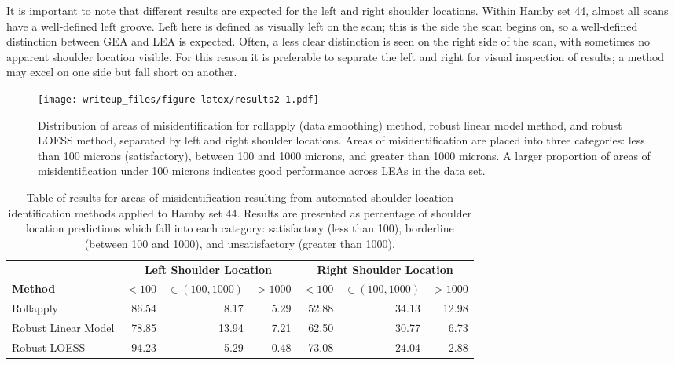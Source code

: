 \documentclass[12pt]{article}
\begin{document}
It is important to note that different results are expected for the left
and right shoulder locations. Within Hamby set 44, almost all scans have
a well-defined left groove. Left here is defined as visually left on the
scan; this is the side the scan begins on, so a well-defined distinction
between GEA and LEA is expected. Often, a less clear distinction is seen
on the right side of the scan, with sometimes no apparent shoulder
location visible. For this reason it is preferable to separate the left
and right for visual inspection of results; a method may excel on one
side but fall short on another.

\begin{figure}
\centering
\texttt{[image: writeup\_files/figure-latex/results2-1.pdf]}
\caption{\label{results2}Distribution of areas of misidentification for
rollapply (data smoothing) method, robust linear model method, and
robust LOESS method, separated by left and right shoulder locations.
Areas of misidentification are placed into three categories: less than
100 microns (satisfactory), between 100 and 1000 microns, and greater
than 1000 microns. A larger proportion of areas of misidentification
under 100 microns indicates good performance across LEAs in the data
set.}
\end{figure}

\begin{table}[]
\centering
\begin{tabular}{lrrr|rrr}
& \multicolumn{3}{c}{\textbf{Left Shoulder Location}} & \multicolumn{3}{c}{\textbf{Right Shoulder Location}} \\
\textbf{Method} & $< 100$ & $ \in (100, 1000) $ & $>1000$ & $< 100$ & $\in (100, 1000)$ & $>1000$ \\ \hline
Rollapply & 86.54 & 8.17 & 5.29 & 52.88& 34.13&12.98  \\ \hline
Robust Linear Model & 78.85 & 13.94 & 7.21 & 62.50 & 30.77&6.73 \\ \hline
Robust LOESS & 94.23 & 5.29 & 0.48 & 73.08& 24.04&2.88\\ \hline
\end{tabular}
\caption{Table of results for areas of misidentification resulting from automated shoulder location identification methods applied to Hamby set 44. Results are presented as percentage of shoulder location predictions which fall into each category: satisfactory (less than 100), borderline (between 100 and 1000), and unsatisfactory (greater than 1000).}
\label{results-table}
\end{table}
\end{document}
